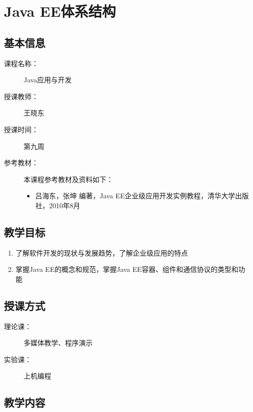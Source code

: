 \chapter*{Java EE体系结构}
\label{chp:JavaEE-architecture}

\section*{基本信息}
\sline
\begin{description}
\item[课程名称：] Java应用与开发
\item[授课教师：] 王晓东
\item[授课时间：] 第九周
\item[参考教材：] 本课程参考教材及资料如下：
  \begin{itemize}
  \item 吕海东，张坤 编著，Java EE企业级应用开发实例教程，清华大学出版社，2010年8月
  \end{itemize}
\end{description}

\section*{教学目标}

\sline

\begin{enumerate}
\item 了解软件开发的现状与发展趋势，了解企业级应用的特点
\item 掌握Java EE的概念和规范，掌握Java EE容器、组件和通信协议的类型和功能
\end{enumerate}  

\section*{授课方式}

\sline
\begin{description}
\item[理论课：] 多媒体教学、程序演示
\item[实验课：] 上机编程
\end{description}

\newpage
\section*{教学内容}
\sline


